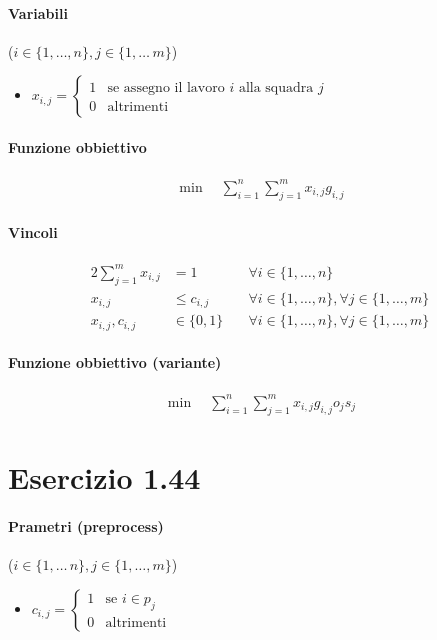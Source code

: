 \documentclass{article}
\begin{document}
\paragraph{Variabili} ($i \in \{1,\ldots,n\}, j \in \{1,\ldots\,m\}$)
\begin{itemize}
  \item $x_{i,j} = \begin{cases}
    1 &\text{se assegno il lavoro }i\text{ alla squadra }j\\
    0 &\text{altrimenti}
  \end{cases}$
\end{itemize}

\paragraph{Funzione obbiettivo}
\begin{align*}
  \min \quad \sum_{i=1}^n \sum_{j=1}^m x_{i,j} g_{i,j}
\end{align*}

\paragraph{Vincoli}
\begin{alignat}{2}
  \sum_{j=1}^m x_{i,j} &= 1 &\forall i \in \{1,\ldots,n\} \\
  x_{i,j} &\leq c_{i,j} &\forall i \in \{1,\ldots,n\}, \forall j \in \{1,\ldots,m\} \\
  x_{i,j}, c_{i,j} &\in \{0,1\} \quad &\forall i \in \{1,\ldots,n\}, \forall j \in \{1,\ldots,m\}
\end{alignat}

\paragraph{Funzione obbiettivo (variante)}
\begin{align*}
  \min \quad \sum_{i=1}^n \sum_{j=1}^m x_{i,j} g_{i,j} o_j s_j
\end{align*}

\pagebreak
\section{Esercizio 1.44}

\paragraph{Prametri (preprocess)} ($i \in \{1,\ldots\,n\}, j \in \{1,\ldots,m\}$)
\begin{itemize}
  \item $c_{i,j} = \begin{cases}
    1 &\text{se }i \in p_j\\
    0 &\text{altrimenti}
  \end{cases}$
\end{itemize}
\end{document}
